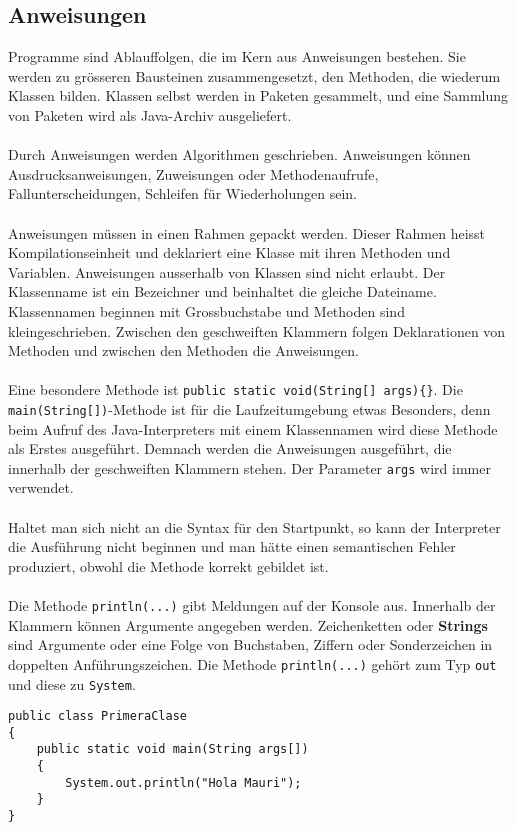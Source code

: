 \subsection{Anweisungen}
Programme sind Ablauffolgen, die im Kern aus Anweisungen bestehen. Sie werden zu grösseren Bausteinen zusammengesetzt, den Methoden, die wiederum Klassen bilden. Klassen selbst werden in Paketen gesammelt, und eine Sammlung von Paketen wird als Java-Archiv ausgeliefert.
\\\\
Durch Anweisungen werden Algorithmen geschrieben. Anweisungen können Ausdrucksanweisungen, Zuweisungen oder Methodenaufrufe, Fallunterscheidungen, Schleifen für Wiederholungen sein.
\\\\
Anweisungen müssen in einen Rahmen gepackt werden. Dieser Rahmen heisst Kompilationseinheit und deklariert eine Klasse mit ihren Methoden und Variablen. Anweisungen ausserhalb von Klassen sind nicht erlaubt. Der Klassenname ist ein Bezeichner und beinhaltet die gleiche Dateiname. Klassennamen beginnen mit Grossbuchstabe und Methoden sind kleingeschrieben. Zwischen den geschweiften Klammern folgen Deklarationen von Methoden und zwischen den Methoden die Anweisungen.
\\\\
Eine besondere Methode ist \texttt{public static void(String[] args)\{\}}. Die \texttt{main(String[])}-Methode ist für die Laufzeitumgebung etwas Besonders, denn beim Aufruf des Java-Interpreters mit einem Klassennamen wird diese Methode als Erstes ausgeführt. Demnach werden die Anweisungen ausgeführt, die innerhalb der geschweiften Klammern stehen. Der Parameter \texttt{args} wird immer verwendet.
\\\\
Haltet man sich nicht an die Syntax für den Startpunkt, so kann der Interpreter die Ausführung nicht beginnen und man hätte einen semantischen Fehler produziert, obwohl die Methode korrekt gebildet ist.
\\\\
Die Methode \texttt{println(...)} gibt Meldungen auf der Konsole aus. Innerhalb der Klammern können Argumente angegeben werden. Zeichenketten oder \textbf{Strings} sind Argumente oder eine Folge von Buchstaben, Ziffern oder Sonderzeichen in doppelten Anführungszeichen. Die Methode \texttt{println(...)} gehört zum Typ \texttt{out} und diese zu \texttt{System}.
\begin{lstlisting} 
public class PrimeraClase 
{
    public static void main(String args[])
    {       
        System.out.println("Hola Mauri");
    }
}
\end{lstlisting}
